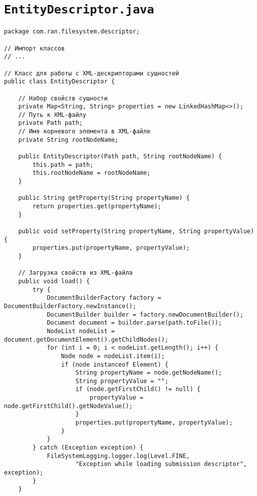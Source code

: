\section*{\texttt{EntityDescriptor.java}}
\begin{verbatim}
package com.ran.filesystem.descriptor;

// Импорт классов
// ...

// Класс для работы с XML-дескрипторами сущностей
public class EntityDescriptor {

    // Набор свойств сущности
    private Map<String, String> properties = new LinkedHashMap<>();
    // Путь к XML-файлу
    private Path path;
    // Имя корневого элемента в XML-файле
    private String rootNodeName;

    public EntityDescriptor(Path path, String rootNodeName) {
        this.path = path;
        this.rootNodeName = rootNodeName;
    }
    
    public String getProperty(String propertyName) {
        return properties.get(propertyName);
    }
    
    public void setProperty(String propertyName, String propertyValue) {
        properties.put(propertyName, propertyValue);
    }
    
    // Загрузка свойств из XML-файла
    public void load() {
        try {
            DocumentBuilderFactory factory = DocumentBuilderFactory.newInstance();
            DocumentBuilder builder = factory.newDocumentBuilder();
            Document document = builder.parse(path.toFile());
            NodeList nodeList = document.getDocumentElement().getChildNodes();
            for (int i = 0; i < nodeList.getLength(); i++) {
                Node node = nodeList.item(i);
                if (node instanceof Element) {
                    String propertyName = node.getNodeName();
                    String propertyValue = "";
                    if (node.getFirstChild() != null) {
                        propertyValue = node.getFirstChild().getNodeValue();
                    }
                    properties.put(propertyName, propertyValue);
                }
            }
        } catch (Exception exception) {
            FileSystemLogging.logger.log(Level.FINE,
                    "Exception while loading submission descriptor", exception);
        }
    }
    

\end{verbatim}

